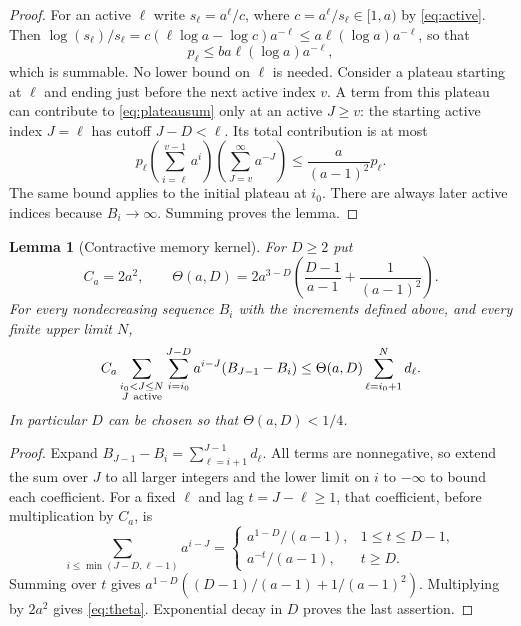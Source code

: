 \documentclass[11pt]{amsart}
\newtheorem{lemma}[theorem]{Lemma}
\theoremstyle{remark}\newtheorem{remark}[theorem]{Remark}
\begin{document}
\begin{proof}
For an active $\ell$ write $s_\ell=a^\ell/c$, where $c=a^\ell/s_\ell\in[1,a)$
by \eqref{eq:active}. Then
$\log(s_\ell)/s_\ell=c(\ell\log a-\log c)a^{-\ell}\le a\ell(\log a)a^{-\ell}$,
so that
\[
 p_\ell\le ba\ell(\log a)a^{-\ell},
\]
which is summable. No lower bound on $\ell$ is needed. Consider a plateau starting at $\ell$ and ending just
before the next active index $v$. A term from this plateau can contribute
to \eqref{eq:plateausum} only at an active $J\ge v$: the starting active
index $J=\ell$ has cutoff $J-D<\ell$. Its total contribution is at most
\[
 p_\ell
 \left(\sum_{i=\ell}^{v-1}a^i\right)
 \left(\sum_{J=v}^{\infty}a^{-J}\right)
 \le \frac{a}{(a-1)^2}p_\ell.
\]
The same bound applies to the initial plateau at $i_0$. There are always
later active indices because $B_i\to\infty$. Summing proves the lemma.
\end{proof}

\begin{lemma}[Contractive memory kernel]\label{lem:kernel}
For $D\ge2$ put
\begin{equation}\label{eq:theta}
 C_a=2a^2,\qquad
 \Theta(a,D)=2a^{3-D}
 \left(\frac{D-1}{a-1}+\frac{1}{(a-1)^2}\right).
\end{equation}
For every nondecreasing sequence $B_i$ with the increments defined above,
and every finite upper limit $N$,
\begin{equation}\label{eq:kernelsum}
 C_a\sum_{\substack{i_0<J\le N\\J\ {\rm active}}}
       \sum_{i=i_0}^{J-D}a^{i-J}(B_{J-1}-B_i)
 \le\Theta(a,D)\sum_{\ell=i_0+1}^{N}d_\ell.
\end{equation}
In particular $D$ can be chosen so that $\Theta(a,D)<1/4$.
\end{lemma}

\begin{proof}
Expand $B_{J-1}-B_i=\sum_{\ell=i+1}^{J-1}d_\ell$. All terms are
nonnegative, so extend the sum over $J$ to all larger integers and the
lower limit on $i$ to $-\infty$ to bound each coefficient. For a fixed
$\ell$ and lag $t=J-\ell\ge1$, that coefficient, before multiplication by
$C_a$, is
\[
 \sum_{i\le\min(J-D,\ell-1)}a^{i-J}
 =\begin{cases}
  a^{1-D}/(a-1),&1\le t\le D-1,\\
  a^{-t}/(a-1),&t\ge D.
 \end{cases}
\]
Summing over $t$ gives
$a^{1-D}((D-1)/(a-1)+1/(a-1)^2)$. Multiplying by $2a^2$ gives
\eqref{eq:theta}. Exponential decay in $D$ proves the last assertion.
\end{proof}
\end{document}
